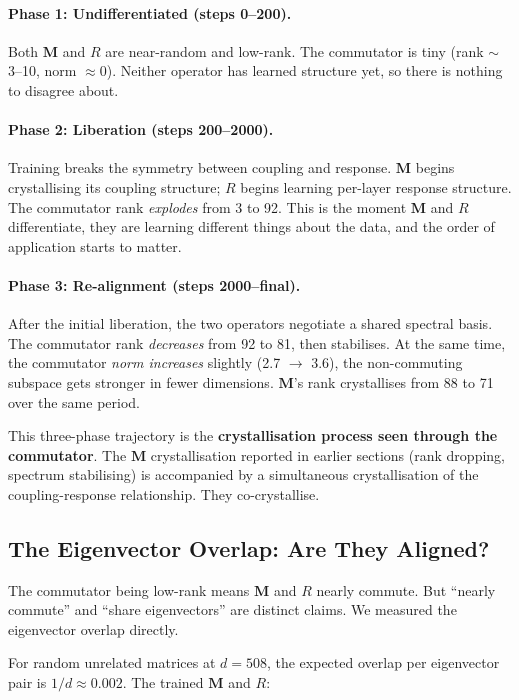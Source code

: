 \documentclass[11pt, a4paper]{article}
\newcommand{\M}{\mathbf{M}}
\theoremstyle{remark}
\begin{document}
\paragraph{Phase 1: Undifferentiated (steps 0--200).}
Both $\M$ and $R$ are near-random and low-rank. The commutator is tiny (rank $\sim$3--10, norm $\approx 0$).
Neither operator has learned structure yet, so there is nothing to disagree about.

\paragraph{Phase 2: Liberation (steps 200--2000).}
Training breaks the symmetry between coupling and response.
$\M$ begins crystallising its coupling structure; $R$ begins learning per-layer response structure.
The commutator rank \emph{explodes} from 3 to 92.
This is the moment $\M$ and $R$ differentiate, they are learning different things about the data, and the order of application starts to matter.

\paragraph{Phase 3: Re-alignment (steps 2000--final).}
After the initial liberation, the two operators negotiate a shared spectral basis.
The commutator rank \emph{decreases} from 92 to 81, then stabilises.
At the same time, the commutator \emph{norm increases} slightly (2.7 $\to$ 3.6), the non-commuting subspace gets stronger in fewer dimensions.
$\M$'s rank crystallises from 88 to 71 over the same period.

This three-phase trajectory is the \textbf{crystallisation process seen through the commutator}.
The $\M$ crystallisation reported in earlier sections (rank dropping, spectrum stabilising) is accompanied by a simultaneous crystallisation of the coupling-response relationship.
They co-crystallise.

\subsection{The Eigenvector Overlap: Are They Aligned?}

The commutator being low-rank means $\M$ and $R$ nearly commute.
But ``nearly commute'' and ``share eigenvectors'' are distinct claims.
We measured the eigenvector overlap directly.

For random unrelated matrices at $d = 508$, the expected overlap per eigenvector pair is $1/d \approx 0.002$.
The trained $\M$ and $R$:
\end{document}
